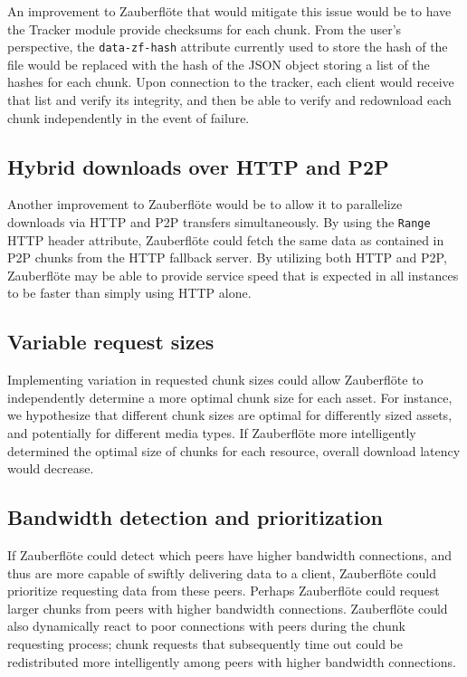 \documentclass[letterpaper,twocolumn,10pt]{article}
\newcommand{\zbf}{Zauberfl\"{o}te\xspace}
\begin{document}
An improvement to \zbf that would mitigate this issue would be to have the Tracker
module provide checksums for each chunk. From the user's perspective, the
\texttt{data-zf-hash} attribute currently used to store the hash of the file
would be replaced with the hash of the JSON object storing a list of the hashes
for each chunk. Upon connection to the tracker, each client would receive that
list and verify its integrity, and then be able to verify and redownload each chunk
independently in the event of failure.

\subsection{Hybrid downloads over HTTP and P2P}

Another improvement to \zbf would be to allow it to parallelize downloads via HTTP and P2P transfers simultaneously. By using the \texttt{Range} HTTP header attribute, \zbf could fetch the same data as contained in P2P chunks from the HTTP fallback server. By utilizing both HTTP and P2P, \zbf may be able to provide service speed that is expected in all instances to be faster than simply using HTTP alone.

\subsection{Variable request sizes}

Implementing variation in requested chunk sizes could allow \zbf to independently
determine a more optimal chunk size for each asset. For instance, we hypothesize
that different chunk sizes are optimal for differently sized assets, and potentially
for different media types. If \zbf more intelligently determined the optimal size
of chunks for each resource, overall download latency would decrease.

\subsection{Bandwidth detection and prioritization}

If \zbf could detect which peers have higher bandwidth connections, and thus
are more capable of swiftly delivering data to a client, \zbf could prioritize
requesting data from these peers. Perhaps \zbf could request larger chunks from
peers with higher bandwidth connections. \zbf could also dynamically react to
poor connections with peers during the chunk requesting process; chunk requests
that subsequently time out could be redistributed more intelligently among
peers with higher bandwidth connections.
\end{document}
